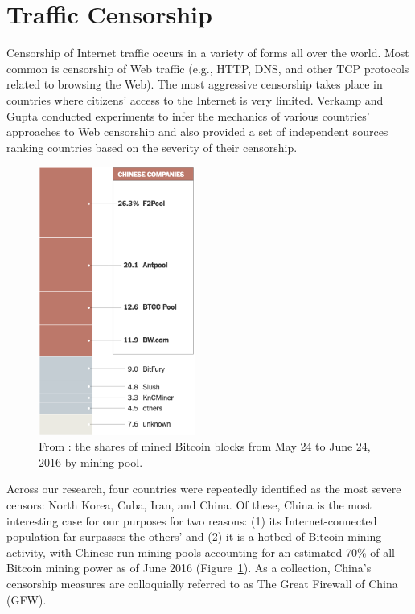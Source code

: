 \section{Traffic Censorship}
Censorship of Internet traffic occurs in a variety of forms all over the world. Most common is censorship of Web traffic (e.g., HTTP, DNS, and other TCP protocols related to browsing the Web). The most aggressive censorship takes place in countries where citizens' access to the Internet is very limited. Verkamp and Gupta \cite{Verkamp2012} conducted experiments to infer the mechanics of various countries' approaches to Web censorship and also provided a set of independent sources ranking countries based on the severity of their censorship. 

\begin{figure}[h]
\centering
\includegraphics[height=250pt]{Images/NYT-Bitcoin-China.png}
\caption{From \cite{Popper2016}: the shares of mined Bitcoin blocks from May 24 to June 24, 2016 by mining pool.}
\label{fig:BTCPools}
\end{figure}

Across our research, four countries were repeatedly identified as the most severe censors: North Korea, Cuba, Iran, and China. Of these, China is the most interesting case for our purposes for two reasons: (1) its Internet-connected population far surpasses the others' and (2) it is a hotbed of Bitcoin mining activity, with Chinese-run mining pools accounting for an estimated 70\% of all Bitcoin mining power as of June 2016 (Figure~\ref{fig:BTCPools}). As a collection, China's censorship measures are colloquially referred to as The Great Firewall of China (GFW).
